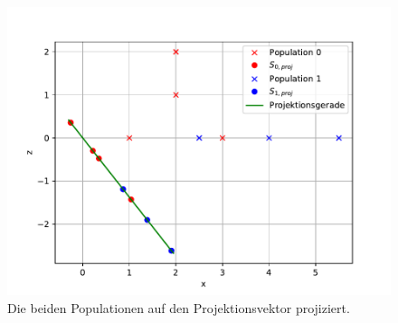 \begin{figure}[H]
  \includegraphics[width=\linewidth]{Python/Aufgabe3d.pdf}
  \caption{Die beiden Populationen auf den Projektionsvektor projiziert.}
\end{figure}




